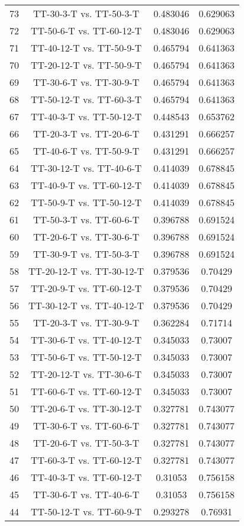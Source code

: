 \documentclass[a4paper,10pt]{article}
\begin{document}
\begin{landscape}
\begin{table}[!htp]
\begin{tabular}{cccc}
73&TT-30-3-T vs. TT-50-3-T&0.483046&0.629063\\
72&TT-50-6-T vs. TT-60-12-T&0.483046&0.629063\\
71&TT-40-12-T vs. TT-50-9-T&0.465794&0.641363\\
70&TT-20-12-T vs. TT-50-9-T&0.465794&0.641363\\
69&TT-30-6-T vs. TT-30-9-T&0.465794&0.641363\\
68&TT-50-12-T vs. TT-60-3-T&0.465794&0.641363\\
67&TT-40-3-T vs. TT-50-12-T&0.448543&0.653762\\
66&TT-20-3-T vs. TT-20-6-T&0.431291&0.666257\\
65&TT-40-6-T vs. TT-50-9-T&0.431291&0.666257\\
64&TT-30-12-T vs. TT-40-6-T&0.414039&0.678845\\
63&TT-40-9-T vs. TT-60-12-T&0.414039&0.678845\\
62&TT-50-9-T vs. TT-50-12-T&0.414039&0.678845\\
61&TT-50-3-T vs. TT-60-6-T&0.396788&0.691524\\
60&TT-20-6-T vs. TT-30-6-T&0.396788&0.691524\\
59&TT-30-9-T vs. TT-50-3-T&0.396788&0.691524\\
58&TT-20-12-T vs. TT-30-12-T&0.379536&0.70429\\
57&TT-20-9-T vs. TT-60-12-T&0.379536&0.70429\\
56&TT-30-12-T vs. TT-40-12-T&0.379536&0.70429\\
55&TT-20-3-T vs. TT-30-9-T&0.362284&0.71714\\
54&TT-30-6-T vs. TT-40-12-T&0.345033&0.73007\\
53&TT-50-6-T vs. TT-50-12-T&0.345033&0.73007\\
52&TT-20-12-T vs. TT-30-6-T&0.345033&0.73007\\
51&TT-60-6-T vs. TT-60-12-T&0.345033&0.73007\\
50&TT-20-6-T vs. TT-30-12-T&0.327781&0.743077\\
49&TT-30-6-T vs. TT-60-6-T&0.327781&0.743077\\
48&TT-20-6-T vs. TT-50-3-T&0.327781&0.743077\\
47&TT-60-3-T vs. TT-60-12-T&0.327781&0.743077\\
46&TT-40-3-T vs. TT-60-12-T&0.31053&0.756158\\
45&TT-30-6-T vs. TT-40-6-T&0.31053&0.756158\\
44&TT-50-12-T vs. TT-60-9-T&0.293278&0.76931\\

\end{tabular}
\end{table}
\end{landscape}
\end{document}
